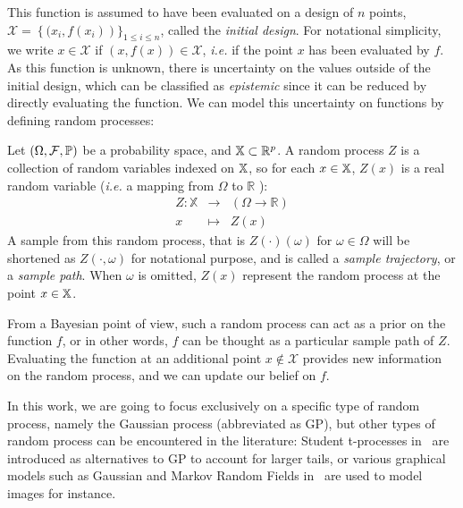 \documentclass[../../Main_ManuscritThese.tex]{subfiles}
\begin{document}
This function is assumed to have been evaluated on a design of $n$ points, $\mathcal{X} = \left\{ (x_i, f(x_i) \right)\}_{1\leq i\leq n}$, called the \emph{initial design}. For notational simplicity, we write $x\in \mathcal{X}$ if $(x, f(x)) \in \mathcal{X}$, \textit{i.e.} if the point $x$ has been evaluated by $f$.
As this function is unknown, there is uncertainty on the values outside of the initial design, which can be classified as \emph{epistemic} since it can be reduced by directly evaluating the function.
We can model this uncertainty on functions by defining random processes:
\begin{definition}
  Let $(\Omega, \mathcal{F}, \mathbb{P})$ be a probability space, and $\mathbb{X}\subset \mathbb{R}^p$.
  A random process $Z$ is a collection of random variables indexed on $\mathbb{X}$, so for each $x \in \mathbb{X}$, $Z(x)$ is a real random variable (\textit{i.e.} a mapping from $\Omega$ to $\mathbb{R}$%
  ):
 \begin{equation}
  \begin{array}{rcl}
    Z: \mathbb{X} & \longrightarrow & \left(\Omega \rightarrow \mathbb{R} \right)\\
    x& \longmapsto & Z(x)
  \end{array}
\end{equation}
A sample from this random process, that is $Z(\cdot)(\omega)$ for $\omega \in \Omega$ will be shortened as $Z(\cdot, \omega)$ for notational purpose, and is called a \emph{sample trajectory}, or a \emph{sample path}.
When $\omega$ is omitted, $Z(x)$ represent the random process at the point $x \in \mathbb{X}$.
\end{definition}
From a Bayesian point of view, such a random process can act as a prior on the function $f$, or in other words, $f$ can be thought as a particular sample path of $Z$.
Evaluating the function at an additional point $x \notin \mathcal{X}$ provides new information on the random process, and we can update our belief on $f$.


In this work, we are going to focus exclusively on a specific type of random process, namely the Gaussian process (abbreviated as GP), but other types of random process can be encountered in the literature: Student t-processes in~\cite{shah_student-t_2014} are introduced as alternatives to GP to account for larger tails, or various graphical models such as Gaussian and Markov Random Fields in~\cite{bishop_pattern_2006,li_markov_2009} are used to model images for instance.
\end{document}
